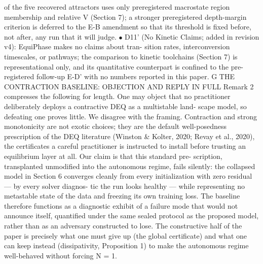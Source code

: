 \documentclass{article}
\begin{document}
of the five recovered attractors uses only preregistered macrostate region membership and
relative V (Section 7); a stronger preregistered depth-margin criterion is deferred to the
E-B amendment so that its threshold is fixed before, not after, any run that it will judge.
$\bullet$  D11' (No Kinetic Claims; added in revision v4): EquiPhase makes no claims about tran-
sition rates, interconversion timescales, or pathways; the comparison to kinetic toolchains
(Section 7) is representational only, and its quantitative counterpart is confined to the pre-
registered follow-up E-D' with no numbers reported in this paper.
G
THE CONTRACTION BASELINE: OBJECTION AND REPLY IN FULL
Remark 2 compresses the following for length.
One may object that no practitioner deliberately deploys a contractive DEQ as a multistable land-
scape model, so defeating one proves little. We disagree with the framing. Contraction and strong
monotonicity are not exotic choices; they are the default well-posedness prescription of the DEQ
literature (Winston \& Kolter, 2020; Revay et al., 2020), the certificates a careful practitioner is
instructed to install before trusting an equilibrium layer at all. Our claim is that this standard pre-
scription, transplanted unmodified into the autonomous regime, fails silently: the collapsed model in
Section 6 converges cleanly from every initialization with zero residual --- by every solver diagnos-
tic the run looks healthy --- while representing no metastable state of the data and freezing its own
training loss. The baseline therefore functions as a diagnostic exhibit of a failure mode that would
not announce itself, quantified under the same sealed protocol as the proposed model, rather than as
an adversary constructed to lose. The constructive half of the paper is precisely what one must give
up (the global certificate) and what one can keep instead (dissipativity, Proposition 1) to make the
autonomous regime well-behaved without forcing N = 1.
\end{document}

